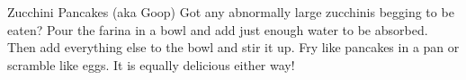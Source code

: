 \begin{recipe}{Zucchini Pancakes (aka Goop)}{}{}
\freeform Got any abnormally large zucchinis begging to be eaten?
Pour the farina in a bowl and add just enough water to be absorbed. Then add everything else to the bowl and stir it up. Fry like pancakes in a pan or scramble like eggs. It is equally delicious either way!
\end{recipe}
